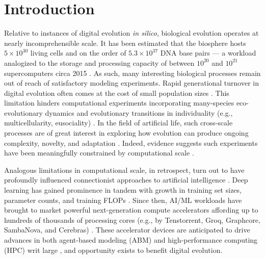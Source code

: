 \section{Introduction}
\label{moreno:sec:introduction}
\vspace{-2.0ex}

Relative to instances of digital evolution \textit{in silico}, biological evolution operates at nearly incomprehensible scale.
It has been estimated that the biosphere hosts $5 \times 10^{30}$ living cells and on the order of $5.3 \times 10^{37}$ DNA base pairs --- a workload analogized to the storage and processing capacity of between $10^{20}$ and $10^{21}$ supercomputers circa 2015 \cite{Landenmark2015}.
As such, many interesting biological processes remain out of reach of satisfactory modeling experiments.
Rapid generational turnover in digital evolution often comes at the cost of small population sizes \cite{moreno2022engineering}.
This limitation hinders computational experiments incorporating many-species eco-evolutionary dynamics and evolutionary transitions in individuality (e.g., multicellularity, eusociality) \cite{penczykowski2016understanding,alizon2012modelling,schreiber2021cross}.
In the field of artificial life, such cross-scale processes are of great interest in exploring how evolution can produce ongoing complexity, novelty, and adaptation \cite{taylor2016open,dolson2021digital,taylor2019evolutionary,ackley2014indefinitely}.
Indeed, evidence suggests such experiments have been meaningfully constrained by computational scale \cite{channon2019maximum}.

Analogous limitations in computational scale, in retrospect, turn out to have profoundly influenced connectionist approaches to artificial intelligence \cite{kaplan2020scaling}.
Deep learning has gained prominence in tandem with growth in training set sizes, parameter counts, and training FLOPs \cite{marcus2018deep}.
Since then, AI/ML workloads have brought to market powerful next-generation compute accelerators affording up to hundreds of thousands of processing cores (e.g., by Tenstorrent, Groq, Graphcore, SambaNova, and Cerebras) \cite{zhang2016cambricon,emani2021accelerating,jia2019dissecting,medina2020habana}.
These accelerator devices are anticipated to drive advances in both agent-based modeling (ABM) and high-performance computing (HPC) writ large \cite{perumalla2022computer,VanEssendelft2025}, and opportunity exists to benefit digital evolution.

